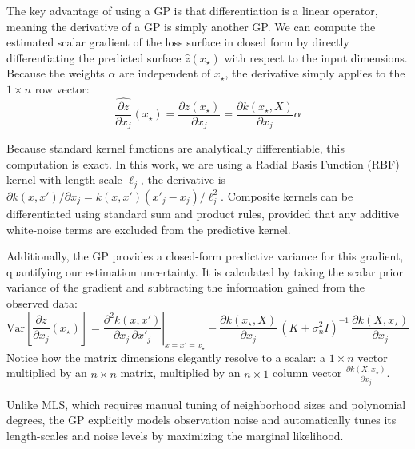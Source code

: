 \documentclass[]{fairmeta}
\begin{document}
The key advantage of using a GP is that differentiation is a linear operator, meaning the derivative of a GP is simply another GP. We can compute the estimated scalar gradient of the loss surface in closed form by directly differentiating the predicted surface $\hat{z}(x_\star)$ with respect to the input dimensions. Because the weights $\alpha$ are independent of $x_\star$, the derivative simply applies to the $1 \times n$ row vector:
$$ \widehat{\frac{\partial z}{\partial x_j}}(x_\star) = \frac{\partial \hat{z}(x_\star)}{\partial x_j} = \frac{\partial k(x_\star,X)}{\partial x_j} \alpha $$

Because standard kernel functions are analytically differentiable, this computation is exact. In this work, we are using a Radial Basis Function (RBF) kernel with length-scale $\ell_j$, the derivative is $\partial k(x,x')/\partial x_j = k(x,x')(x'_j-x_j)/\ell_j^2$. Composite kernels can be differentiated using standard sum and product rules, provided that any additive white-noise terms are excluded from the predictive kernel.

Additionally, the GP provides a closed-form predictive variance for this gradient, quantifying our estimation uncertainty. It is calculated by taking the scalar prior variance of the gradient and subtracting the information gained from the observed data:
$$ \mathrm{Var}\!\left[\frac{\partial z}{\partial x_j}(x_\star)\right] = \left.\frac{\partial^2 k(x,x')}{\partial x_j\,\partial x'_j}\right|_{x=x'=x_\star} - \frac{\partial k(x_\star,X)}{\partial x_j}\,(K+\sigma_n^2 I)^{-1}\,\frac{\partial k(X,x_\star)}{\partial x_j} $$
Notice how the matrix dimensions elegantly resolve to a scalar: a $1 \times n$ vector multiplied by an $n \times n$ matrix, multiplied by an $n \times 1$ column vector $\frac{\partial k(X,x_\star)}{\partial x_j}$.

Unlike MLS, which requires manual tuning of neighborhood sizes and polynomial degrees, the GP explicitly models observation noise and automatically tunes its length-scales and noise levels by maximizing the marginal likelihood.
\end{document}
